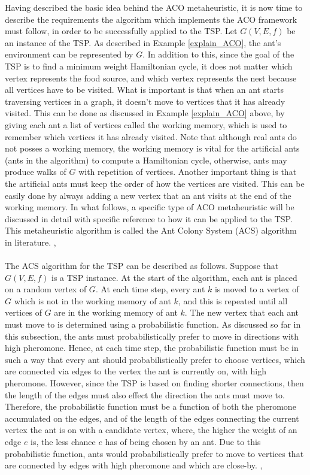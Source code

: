 \documentclass[12pt]{article}
\numberwithin{equation}{subsection}
\numberwithin{table}{subsection}
\numberwithin{algorithm}{subsection}
\numberwithin{figure}{subsection}
\begin{document}
Having described the basic idea behind the ACO metaheuristic, it is now time to describe the requirements the algorithm which implements the ACO framework must follow, in order to be successfully applied to the TSP. Let $G(V,E,f)$ be an instance of the TSP. As described in Example \ref{explain_ACO}, the ant's environment can be represented by $G$. In addition to this, since the goal of the TSP is to find a minimum weight Hamiltonian cycle, it does not matter which vertex represents the food source, and which vertex represents the nest because all vertices have to be visited. What is important is that when an ant starts traversing vertices in a graph, it doesn't move to vertices that it has already visited. This can be done as discussed in Example \ref{explain_ACO} above, by giving each ant a list of vertices called  the working memory, which is used to remember which vertices it has already visited. Note that although real ants do not posses a working memory, the working memory is vital for the artificial ants (ants in the algorithm) to compute a Hamiltonian cycle, otherwise, ants may produce walks of $G$ with repetition of vertices. Another important thing is that the artificial ants must keep the order of how the vertices are visited. This can be easily done by always adding a new vertex that an ant visits at the end of the working memory. In what follows, a specific type of ACO metaheuristic will be discussed in detail with specific reference to how it can be applied to the TSP. This metaheuristic algorithm is called the Ant Colony System (ACS) algorithm in literature. \cite{dorigo_gambardella_1997}, \cite{dorigo_stutzle_thomas_2004}\\\\
The ACS algorithm for the TSP can be described as follows. Suppose that $G(V,E,f)$ is a TSP instance. At the start of the algorithm, each ant is placed on a random vertex of $G$. At each time step, every ant $k$ is moved to a vertex of $G$ which is not in the working memory of ant $k$, and this is repeated until all vertices of $G$ are in the working memory of ant $k$. The new vertex that each ant must move to is determined using a probabilistic function. As discussed so far in this subsection, the ants must probabilistically prefer to move in directions with high pheromone. Hence, at each time step, the probabilistic function must be in such a way that every ant should probabilistically prefer to choose vertices, which are connected via edges to the vertex the ant is currently on, with high pheromone. However, since the TSP is based on finding shorter connections, then the length of the edges must also effect the direction the ants must move to. Therefore, the probabilistic function must be a function of both the pheromone accumulated on the edges, and of the length of the edges connecting the current vertex the ant is on with a candidate vertex, where, the higher the weight of an edge $e$  is, the less chance $e$ has of being chosen by an ant. Due to this probabilistic function, ants would probabilistically prefer to move to vertices that are connected by edges with high pheromone and which are close-by. \cite{dorigo_gambardella_1997}, \cite{dorigo_stutzle_thomas_2004}\\\\
\end{document}
